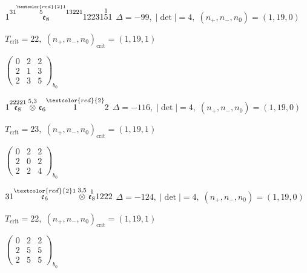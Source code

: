 \documentclass[10pt]{article}
\begin{document}
\smallskip

$1\overset{31\overset{\textcolor{red}{2}1}{5}13221}{\mathfrak{e}_8}12231\overset{1}{5}1$ \quad $\Delta=-99,\; |\det|=4,\; (n_+,n_-,n_0)=(1,19,0)$

\hspace{1em}$T_{\text{crit}}=22,\; (n_+,n_-,n_0)_{\text{crit}}=(1,19,1)$

\hspace{2em}$\left(\begin{smallmatrix}0 & 2 & 2 \\ 2 & 1 & 3 \\ 2 & 3 & 5\end{smallmatrix}\right)_{\!b_0}$

\smallskip

$1\overset{22221}{\mathfrak{e}_8}\overset{5,3}{\otimes}\mathfrak{e}_6\overset{\textcolor{red}{2}}{1}2$ \quad $\Delta=-116,\; |\det|=4,\; (n_+,n_-,n_0)=(1,19,0)$

\hspace{1em}$T_{\text{crit}}=23,\; (n_+,n_-,n_0)_{\text{crit}}=(1,19,1)$

\hspace{2em}$\left(\begin{smallmatrix}0 & 2 & 2 \\ 2 & 0 & 2 \\ 2 & 2 & 4\end{smallmatrix}\right)_{\!b_0}$

\smallskip

$31\overset{\textcolor{red}{2}1}{\mathfrak{e}_6}\overset{3,5}{\otimes}\overset{1}{\mathfrak{e}_8}1222$ \quad $\Delta=-124,\; |\det|=4,\; (n_+,n_-,n_0)=(1,19,0)$

\hspace{1em}$T_{\text{crit}}=22,\; (n_+,n_-,n_0)_{\text{crit}}=(1,19,1)$

\hspace{2em}$\left(\begin{smallmatrix}0 & 2 & 2 \\ 2 & 5 & 5 \\ 2 & 5 & 5\end{smallmatrix}\right)_{\!b_0}$

\smallskip
\end{document}
